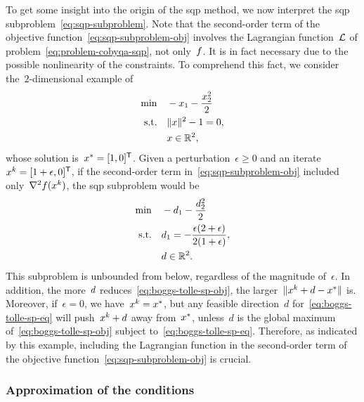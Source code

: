 To get some insight into the origin of the \gls{sqp} method, we now interpret the \gls{sqp} subproblem~\cref{eq:sqp-subproblem}.
Note that the second-order term of the objective function~\cref{eq:sqp-subproblem-obj} involves the Lagrangian function~$\lag$ of problem~\cref{eq:problem-cobyqa-sqp}, not only~$f$.
It is in fact necessary due to the possible nonlinearity of the constraints.
To comprehend this fact, we consider the~$2$-dimensional example of \citeauthor{Boggs_Tolle_1995}~\cite[\S~2.2]{Boggs_Tolle_1995}
\begin{align*}
    \min        & \quad -x_1 - \frac{x_2^2}{2}\\
    \text{s.t.} & \quad \norm{x}^2 - 1 = 0,\\
                & \quad \iter \in \R^2,
\end{align*}
whose solution is~$\iter[\ast] = [1, 0]^{\T}$.
Given a perturbation~$\epsilon \ge 0$ and an iterate~$\iter[k] = [1 + \epsilon, 0]^{\T}$, if the second-order term in~\cref{eq:sqp-subproblem-obj} included only~$\nabla^2 \obj(\iter[k])$, the \gls{sqp} subproblem would be
\begin{subequations}
    \begin{align}
        \min        & \quad -\step_1 - \frac{\step_2^2}{2} \label{eq:boggs-tolle-sp-obj}\\
        \text{s.t.} & \quad \step_1 = -\frac{\epsilon (2 + \epsilon)}{2 (1 + \epsilon)}, \label{eq:boggs-tolle-sp-eq}\\
                    & \quad \step \in \R^2. \nonumber
    \end{align}
\end{subequations}
This subproblem is unbounded from below, regardless of the magnitude of~$\epsilon$.
In addition, the more~$\step$ reduces~\cref{eq:boggs-tolle-sp-obj}, the larger~$\norm{\iter[k] + d - \iter[\ast]}$ is.
Moreover, if~$\epsilon = 0$, we have~$\iter[k] = \iter[\ast]$, but any feasible direction~$d$ for~\cref{eq:boggs-tolle-sp-eq} will push~$\iter[k] + d$ away from~$\iter[\ast]$, unless~$d$ is the global maximum of~\cref{eq:boggs-tolle-sp-obj} subject to~\cref{eq:boggs-tolle-sp-eq}.
Therefore, as indicated by this example, including the Lagrangian function in the second-order term of the objective function~\cref{eq:sqp-subproblem-obj} is crucial.

\subsubsection{Approximation of the  conditions}


